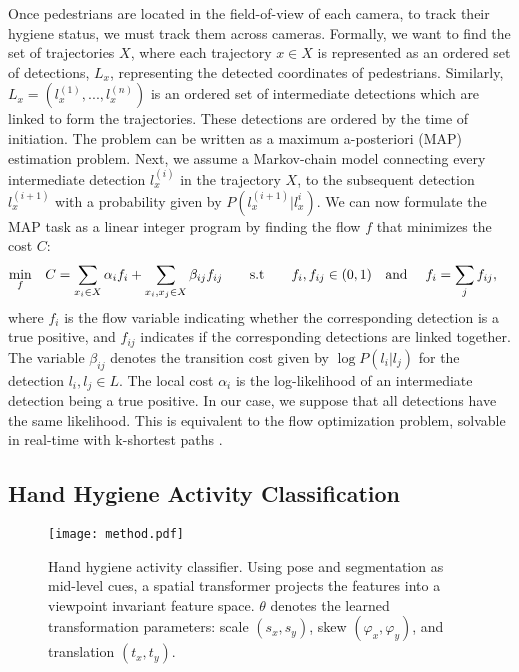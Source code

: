 \documentclass[twoside,11pt]{article}
\begin{document}
Once pedestrians are located in the field-of-view of each camera, to track their hygiene status, we must track them across cameras.
Formally, we want to find the set of trajectories $X$, where each trajectory $x \in X$ is represented as an ordered set of detections, $L_x$, representing the detected coordinates of pedestrians.
Similarly, $L_x = (l_x^{(1)} ,...,l_x^{(n)} )$ is an ordered set of intermediate detections which are linked to form the trajectories.
These detections are ordered by the time of initiation.
The problem can be written as a maximum a-posteriori (MAP) estimation problem.
Next, we assume a Markov-chain model connecting every intermediate detection $l_x^{(i)}$ in the trajectory $X$, to the subsequent detection $l_x^{(i+1)}$ with a probability given by $P(l_x^{(i+1)} | l_x^{i})$.
We can now formulate the MAP task as a linear integer program by finding the flow $f$ that minimizes the cost $C$:
\begin{align}\label{eq:tracklet_generation}
\min_{f} & \quad C =  \sum_{x_i\in X}\alpha_i f_i + \sum_{x_i, x_j \in X}\beta_{ij} f_{ij} \qquad \text{s.t} \qquad f_i, f_{ij} \in (0,1) \text{\quad and \quad} f_{i} = \sum_{j}{f_{ij}},
\end{align}
where $f_i$ is the flow variable indicating whether the corresponding detection is a true positive, and $f_{ij}$ indicates if the corresponding detections are linked together.
The variable $\beta_{ij}$ denotes the transition cost given by $\log P (l_i|l_j)$ for the detection $l_i,l_j\in L$. The local cost $\alpha_i$ is the log-likelihood of an intermediate detection being a true positive.
In our case, we suppose that all detections have the same likelihood.
This is equivalent to the flow optimization problem, solvable in real-time with k-shortest paths  \citep{berclaz2011multiple}.

\subsection{Hand Hygiene Activity Classification}\label{sec:method_classifier}
\begin{figure}[t]
	\centering
	\texttt{[image: method.pdf]}
	\caption{Hand hygiene activity classifier. Using pose and segmentation as mid-level cues, a spatial transformer projects the features into a viewpoint invariant feature space. $\theta$ denotes the learned transformation parameters: scale $(s_x, s_y)$, skew $(\varphi_x, \varphi_y)$, and translation $(t_x, t_y)$.}
	\label{fig:model}
\end{figure}
\end{document}
